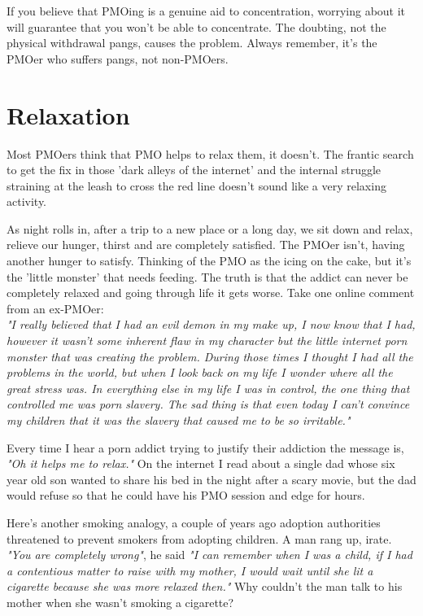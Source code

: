 \documentclass[easypeasy.tex]{subfiles}
\begin{document}
If you believe that PMOing is a genuine aid to concentration, worrying about it will guarantee that you won't be able to concentrate. The doubting, not the physical withdrawal pangs, causes the problem. Always remember, it's the PMOer who suffers pangs, not non-PMOers.

\section{Relaxation}

Most PMOers think that PMO helps to relax them, it doesn't. The frantic search to get the fix in those 'dark alleys of the internet' and the internal struggle straining at the leash to cross the red line doesn't sound like a very relaxing activity.

As night rolls in, after a trip to a new place or a long day, we sit down and relax, relieve our hunger, thirst and are completely satisfied. The PMOer isn't, having another hunger to satisfy. Thinking of the PMO as the icing on the cake, but it's the 'little monster' that needs feeding. The truth is that the addict can never be completely relaxed and going through life it gets worse. Take one online comment from an ex-PMOer:\\
  \textit{"I really believed that I had an evil demon in my make up, I now know that I had, however it wasn't some inherent flaw in my character but the little internet porn monster that was creating the problem. During those times I thought I had all the problems in the world, but when I look back on my life I wonder where all the great stress was. In everything else in my life I was in control, the one thing that controlled me was porn slavery. The sad thing is that even today I can't convince my children that it was the slavery that caused me to be so irritable."}

Every time I hear a porn addict trying to justify their addiction the message is, \textit{"Oh it helps me to relax."} On the internet I read about a single dad whose six year old son wanted to share his bed in the night after a scary movie, but the dad would refuse so that he could have his PMO session and edge for hours.

Here's another smoking analogy, a couple of years ago adoption authorities threatened to prevent smokers from adopting children. A man rang up, irate. \textit{"You are completely wrong"}, he said \textit{"I can remember when I was a child, if I had a contentious matter to raise with my mother, I would wait until she lit a cigarette because she was more relaxed then."} Why couldn't the man talk to his mother when she wasn't smoking a cigarette?
\end{document}
